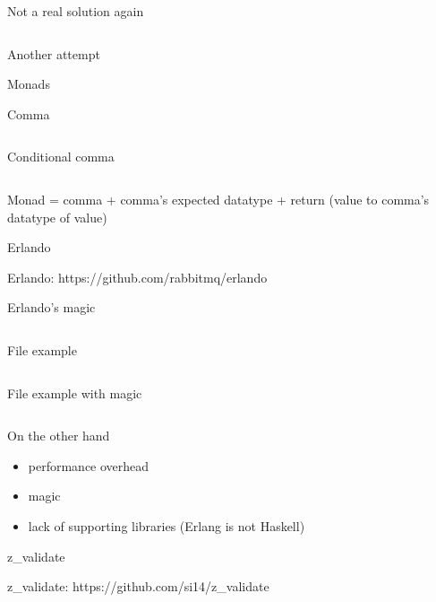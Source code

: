 \documentclass[10pt]{beamer}
\newcommand{\code}[4]{\inputminted[linenos, frame=none, firstline=#2, lastline=#3,
  framesep=10pt, bgcolor=lightgray]{#4}{#1}}
\begin{document}
\begin{frame}{Not a real solution again}
  \code{code.erl}{62}{68}{erlang}
\end{frame}

\begin{frame}{Another attempt}
  \begin{center}
    \Large
    Monads
  \end{center}
\end{frame}

\begin{frame}{Comma}
  \code{code.erl}{70}{72}{erlang}
\end{frame}

\begin{frame}{Conditional comma}
  \code{code.erl}{74}{78}{erlang}
  Monad = comma + comma's expected datatype + return (value to comma's datatype of value)
\end{frame}

\begin{frame}{Erlando}
  \begin{center}
    \Large
    Erlando: https://github.com/rabbitmq/erlando
  \end{center}
\end{frame}

\begin{frame}{Erlando's magic}
  \code{code.erl}{80}{84}{erlang}
\end{frame}

\begin{frame}{File example}
  \footnotesize
  \code{code.erl}{86}{108}{erlang}
\end{frame}

\begin{frame}{File example with magic}
  \small
  \code{code.erl}{110}{120}{erlang}
\end{frame}

\begin{frame}{On the other hand}
  \begin{itemize}
  \item performance overhead
  \item magic
  \item lack of supporting libraries (Erlang is not Haskell)
  \end{itemize}
\end{frame}

\begin{frame}{z\_validate}
  \begin{center}
    \Large
    z\_validate: https://github.com/si14/z\_validate
  \end{center}
\end{frame}
\end{document}

